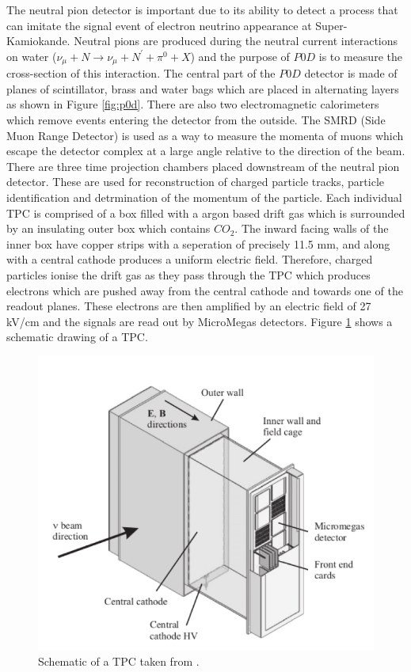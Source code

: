 The neutral pion detector is important due to its ability to detect a process that can imitate the signal event of electron neutrino appearance at Super-Kamiokande. Neutral pions are produced during the neutral current interactions on water ($\nu_{\mu} + N \rightarrow \nu_{\mu} + N^{'} +\pi^{0} + X$) and the purpose of $P0D$ is to measure the cross-section of this interaction. The central part of the $P0D$ detector is made of planes of scintillator, brass and water bags which are placed in alternating layers as shown in Figure \ref{fig:p0d}. There are also two electromagnetic calorimeters which remove events entering the detector from the outside. The SMRD (Side Muon Range Detector) is used as a way to measure the momenta of muons which escape the detector complex at a large angle relative to the direction of the beam. There are three time projection chambers placed downstream of the neutral pion detector. These are used for reconstruction of charged particle tracks, particle identification and detrmination of the momentum of the particle. Each individual TPC is comprised of a box filled with a argon based drift gas which is surrounded by an insulating outer box which contains $CO_{2}$. The inward facing walls of the inner box have copper strips with a seperation of precisely 11.5 mm, and along with a central cathode produces a uniform electric field. Therefore, charged particles ionise the drift gas as they pass through the TPC which produces electrons which are pushed away from the central cathode and towards one of the readout planes. These electrons are then amplified by an electric field of 27 kV/cm and the signals are read out by MicroMegas detectors. Figure \ref{fig:TPC_schematic} shows a schematic drawing of a TPC.

\begin{figure}
    \includegraphics[width=\textwidth]{Figures/tpc_schematic.png}
    \caption{Schematic of a TPC taken from \cite{t2k_collaboration_t2k_2011}.}
\label{fig:TPC_schematic}
\end{figure}

